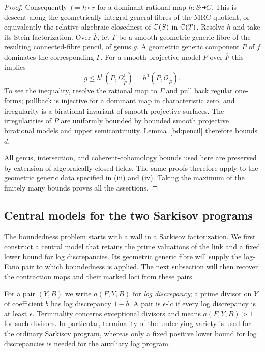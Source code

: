 \begin{proof}
Consequently $f=h\circ r$ for a dominant rational map $h:S\dashrightarrow
C$.  This is descent along the geometrically integral general fibres
of the MRC quotient, or equivalently the relative algebraic closedness
of $\mathbb C(S)$ in $\mathbb C(T)$.  Resolve $h$ and take its Stein factorization.
Over $\overline F$, let $\Gamma$ be a smooth geometric generic fibre
of the resulting connected-fibre pencil, of genus $g$.  A geometric
generic component $P$ of $f$ dominates the corresponding $\Gamma$.
For a smooth projective model $\widetilde P$ over $\overline F$ this implies
\[
 g\leq h^0(\widetilde P,\Omega^1_{\widetilde P})
       =h^1(\widetilde P,\mathcal O_{\widetilde P}).
\]
To see the inequality, resolve the rational map to $\Gamma$ and pull
back regular one-forms; pullback is injective for a dominant map in
characteristic zero, and irregularity is a birational invariant of
smooth projective surfaces.  The irregularities of $\widetilde P$ are
uniformly bounded by bounded smooth projective birational models and
upper semicontinuity.  Lemma~\ref{bd:pencil} therefore bounds $d$.

All genus, intersection, and coherent-cohomology bounds used here are
preserved by extension of algebraically closed fields.  The same proofs
therefore apply to the geometric generic data specified in
\textup{(iii)} and \textup{(iv)}.  Taking the maximum of the finitely many
bounds proves all the assertions.
\end{proof}

\subsection{Central models for the two Sarkisov programs}

The boundedness problem starts with a wall in a Sarkisov factorization.
We first construct a central model that retains the prime valuations of
the link and a fixed lower bound for log discrepancies. Its geometric
generic fibre will supply the log-Fano pair to which boundedness is
applied. The next subsection will then recover the contraction maps and
their marked loci from these pairs.

For a pair $(Y,B)$ we write $a(F,Y,B)$ for \emph{log discrepancy}; a
prime divisor on $Y$ of coefficient $b$ has log discrepancy $1-b$.
A pair is $\epsilon$-lc if every log discrepancy is at least
$\epsilon$.  Terminality concerns exceptional divisors and means
$a(F,Y,B)>1$ for such divisors.  In particular, terminality of the
underlying variety is used for the ordinary Sarkisov program, whereas
only a fixed positive lower bound for log discrepancies is needed for
the auxiliary log program.

